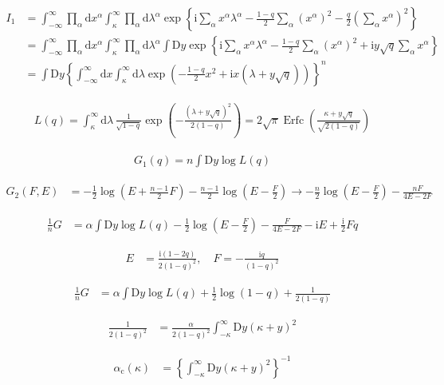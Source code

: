 \documentclass{article}
\begin{document}
\begin{align*}
I_1 &= \int_{-\infty}^{\infty} \prod_{\alpha} \mathrm{d} x^{\alpha} \int_{\kappa}^{\infty} \prod_{\alpha} \mathrm{d} \lambda^{\alpha} \exp\left\{\mathrm{i} \sum_{\alpha} x^{\alpha} \lambda^{\alpha} - \frac{1-q}{2} \sum_{\alpha} (x^{\alpha})^2 - \frac{q}{2} \left(\sum_{\alpha} x^{\alpha}\right)^2 \right\} \\
&= \int_{-\infty}^{\infty} \prod_{\alpha} \mathrm{d} x^{\alpha} \int_{\kappa}^{\infty} \prod_{\alpha} \mathrm{d} \lambda^{\alpha} \int \mathrm{D}y \exp\left\{ \mathrm{i} \sum_{\alpha} x^{\alpha} \lambda^{\alpha} - \frac{1-q}{2} \sum_{\alpha} (x^{\alpha})^2 + \mathrm{i} y \sqrt{q} \sum_{\alpha} x^{\alpha} \right\} \\
&= \int \mathrm{D}y \left\{ \int_{-\infty}^{\infty} \mathrm{d} x \int_{\kappa}^{\infty} \mathrm{d} \lambda \exp\left( -\frac{1-q}{2} x^2 + \mathrm{i} x(\lambda + y \sqrt{q}) \right)\right\}^n
\tag{7.84}
\end{align*}

\begin{align*}
L(q) = \int_\kappa^\infty \mathrm{d}\lambda \, \frac{1}{\sqrt{1-q}} \exp\left( -\frac{(\lambda + y \sqrt{q})^2}{2(1-q)} \right) = 2 \sqrt{\pi} \operatorname{Erfc}\left( \frac{\kappa + y \sqrt{q}}{\sqrt{2(1-q)}} \right)\tag{7.85}
\end{align*}

\begin{align*}
G_{1}(q)=n \int \mathrm{D} y \log L(q)\tag{7.86}
\end{align*}

\begin{align*}
G_2(F, E) &= -\frac{1}{2} \log \left(E + \frac{n-1}{2} F\right) - \frac{n-1}{2} \log \left(E - \frac{F}{2}\right) \rightarrow -\frac{n}{2} \log \left(E - \frac{F}{2}\right) - \frac{n F}{4E - 2F}
\tag{7.87}
\end{align*}

\begin{align*}
\frac{1}{n} G &= \alpha \int \mathrm{D} y \log L(q) - \frac{1}{2} \log \left(E - \frac{F}{2}\right) - \frac{F}{4E - 2F} - \mathrm{i} E + \frac{\mathrm{i}}{2} Fq
\tag{7.88}
\end{align*}

\begin{align*}
E &= \frac{\mathrm{i}(1 - 2q)}{2(1 - q)^2}, \quad F = -\frac{\mathrm{i} q}{(1 - q)^2}
\tag{7.89}
\end{align*}

\begin{align*}
\frac{1}{n} G &= \alpha \int \mathrm{D} y \log L(q) + \frac{1}{2} \log (1 - q) + \frac{1}{2(1 - q)}
\tag{7.90}
\end{align*}

\begin{align*}
\frac{1}{2(1 - q)^2} &= \frac{\alpha}{2(1 - q)^2} \int_{-\kappa}^{\infty} \mathrm{D} y (\kappa + y)^2
\tag{7.91}
\end{align*}

\begin{align*}
\alpha_{\mathrm{c}}(\kappa) &= \left\{\int_{-\kappa}^{\infty} \mathrm{D} y (\kappa + y)^2\right\}^{-1}
\tag{7.92}
\end{align*}
\end{document}
